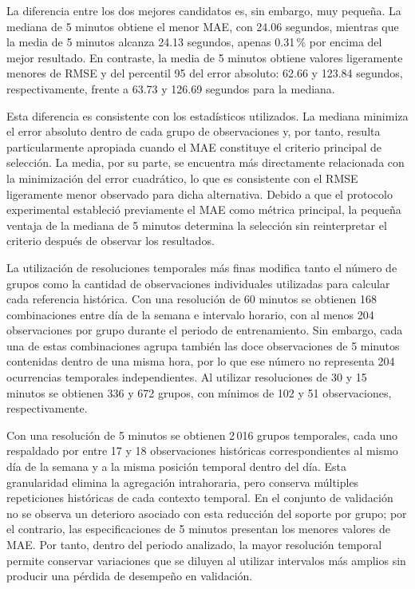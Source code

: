 \documentclass[11pt]{article}
\begin{document}
La diferencia entre los dos mejores candidatos es, sin embargo, muy pequeña. La mediana de 5 minutos obtiene el menor MAE, con 24.06 segundos, mientras que la media de 5 minutos alcanza 24.13 segundos, apenas 0.31\,\% por encima del mejor resultado. En contraste, la media de 5 minutos obtiene valores ligeramente menores de RMSE y del percentil 95 del error absoluto: 62.66 y 123.84 segundos, respectivamente, frente a 63.73 y 126.69 segundos para la mediana.

Esta diferencia es consistente con los estadísticos utilizados. La mediana minimiza el error absoluto dentro de cada grupo de observaciones y, por tanto, resulta particularmente apropiada cuando el MAE constituye el criterio principal de selección. La media, por su parte, se encuentra más directamente relacionada con la minimización del error cuadrático, lo que es consistente con el RMSE ligeramente menor observado para dicha alternativa. Debido a que el protocolo experimental estableció previamente el MAE como métrica principal, la pequeña ventaja de la mediana de 5 minutos determina la selección sin reinterpretar el criterio después de observar los resultados.

La utilización de resoluciones temporales más finas modifica tanto el número de grupos como la cantidad de observaciones individuales utilizadas para calcular cada referencia histórica. Con una resolución de 60 minutos se obtienen 168 combinaciones entre día de la semana e intervalo horario, con al menos 204 observaciones por grupo durante el periodo de entrenamiento. Sin embargo, cada una de estas combinaciones agrupa también las doce observaciones de 5 minutos contenidas dentro de una misma hora, por lo que ese número no representa 204 ocurrencias temporales independientes. Al utilizar resoluciones de 30 y 15 minutos se obtienen 336 y 672 grupos, con mínimos de 102 y 51 observaciones, respectivamente.

Con una resolución de 5 minutos se obtienen 2\,016 grupos temporales, cada uno respaldado por entre 17 y 18 observaciones históricas correspondientes al mismo día de la semana y a la misma posición temporal dentro del día. Esta granularidad elimina la agregación intrahoraria, pero conserva múltiples repeticiones históricas de cada contexto temporal. En el conjunto de validación no se observa un deterioro asociado con esta reducción del soporte por grupo; por el contrario, las especificaciones de 5 minutos presentan los menores valores de MAE. Por tanto, dentro del periodo analizado, la mayor resolución temporal permite conservar variaciones que se diluyen al utilizar intervalos más amplios sin producir una pérdida de desempeño en validación.
\end{document}
